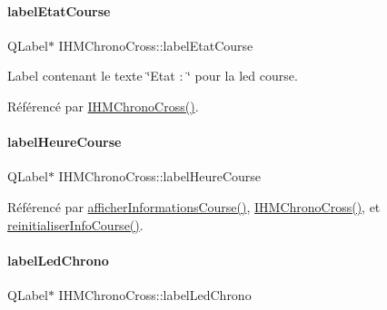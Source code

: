 \paragraph{\texorpdfstring{label\+Etat\+Course}{labelEtatCourse}}
{\footnotesize\ttfamily Q\+Label$\ast$ I\+H\+M\+Chrono\+Cross\+::label\+Etat\+Course\hspace{0.3cm}{\ttfamily [private]}}



Label contenant le texte \char`\"{}\+Etat \+: \char`\"{} pour la led course. 



Référencé par \hyperlink{class_i_h_m_chrono_cross_a479fc90733fba3e65fb06aa4a3adc02e}{I\+H\+M\+Chrono\+Cross()}.

\mbox{\label{class_i_h_m_chrono_cross_ad071b8c6ecc126fca3e17e58e83942d9}} 
\paragraph{\texorpdfstring{label\+Heure\+Course}{labelHeureCourse}}
{\footnotesize\ttfamily Q\+Label$\ast$ I\+H\+M\+Chrono\+Cross\+::label\+Heure\+Course\hspace{0.3cm}{\ttfamily [private]}}



Référencé par \hyperlink{class_i_h_m_chrono_cross_afe18e84e4df15c15921f2bdcfc6f4396}{afficher\+Informations\+Course()}, \hyperlink{class_i_h_m_chrono_cross_a479fc90733fba3e65fb06aa4a3adc02e}{I\+H\+M\+Chrono\+Cross()}, et \hyperlink{class_i_h_m_chrono_cross_a1149f4f57c8cf34048f93fba6b4176b3}{reinitialiser\+Info\+Course()}.

\mbox{\label{class_i_h_m_chrono_cross_ad43bab2d9a06fe2fb198c56d8b9faab2}} 
\paragraph{\texorpdfstring{label\+Led\+Chrono}{labelLedChrono}}
{\footnotesize\ttfamily Q\+Label$\ast$ I\+H\+M\+Chrono\+Cross\+::label\+Led\+Chrono\hspace{0.3cm}{\ttfamily [private]}}



